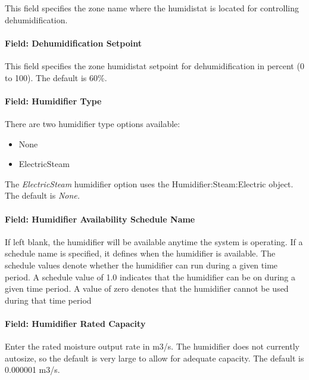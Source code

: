 This field specifies the zone name where the humidistat is located for controlling dehumidification.

\paragraph{Field: Dehumidification Setpoint}\label{field-dehumidification-setpoint-2}

This field specifies the zone humidistat setpoint for dehumidification in percent (0 to 100). The default is 60\%.

\paragraph{Field: Humidifier Type}\label{field-humidifier-type-3}

There are two humidifier type options available:

\begin{itemize}
\item
  None
\item
  ElectricSteam
\end{itemize}

The \emph{ElectricSteam} humidifier option uses the Humidifier:Steam:Electric object. The default is \emph{None.}

\paragraph{Field: Humidifier Availability Schedule Name}\label{field-humidifier-availability-schedule-name-3}

If left blank, the humidifier will be available anytime the system is operating. If a schedule name is specified, it defines when the humidifier is available. The schedule values denote whether the humidifier can run during a given time period. A schedule value of 1.0 indicates that the humidifier can be on during a given time period. A value of zero denotes that the humidifier cannot be used during that time period

\paragraph{Field: Humidifier Rated Capacity}\label{field-humidifier-rated-capacity-3}

Enter the rated moisture output rate in m3/s. The humidifier does not currently autosize, so the default is very large to allow for adequate capacity. The default is 0.000001 m3/s.

